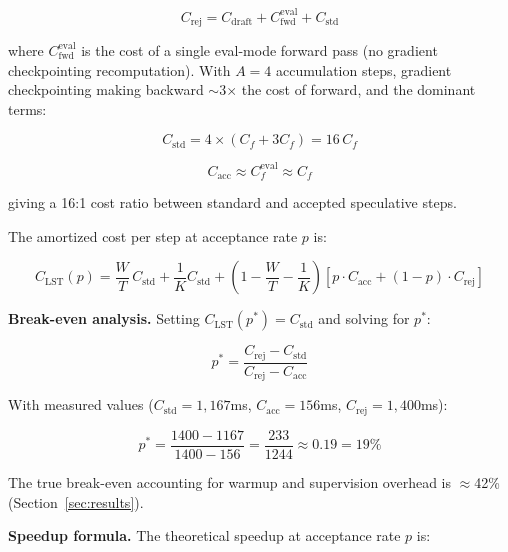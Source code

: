 \documentclass[conference]{IEEEtran}
\begin{document}
\begin{equation}
C_{\mathrm{rej}} = C_{\mathrm{draft}} + C_{\mathrm{fwd}}^{\mathrm{eval}} + C_{\mathrm{std}}
\label{eq:cost_rej}
\end{equation}

where $C_{\mathrm{fwd}}^{\mathrm{eval}}$ is the cost of a single eval-mode forward pass (no gradient checkpointing recomputation). With $A=4$ accumulation steps, gradient checkpointing making backward $\sim$3$\times$ the cost of forward, and the dominant terms:

\begin{equation}
C_{\mathrm{std}} = 4 \times (C_f + 3C_f) = 16\, C_f
\label{eq:cost_std_expanded}
\end{equation}

\begin{equation}
C_{\mathrm{acc}} \approx C_f^{\mathrm{eval}} \approx C_f
\label{eq:cost_acc_expanded}
\end{equation}

giving a 16:1 cost ratio between standard and accepted speculative steps.

The amortized cost per step at acceptance rate $p$ is:

\begin{equation}
C_{\mathrm{LST}}(p) = \frac{W}{T}\, C_{\mathrm{std}} + \frac{1}{K} C_{\mathrm{std}} + \left(1 - \frac{W}{T} - \frac{1}{K}\right) \left[p \cdot C_{\mathrm{acc}} + (1-p) \cdot C_{\mathrm{rej}}\right]
\label{eq:cost_total}
\end{equation}

\noindent\textbf{Break-even analysis.} Setting $C_{\mathrm{LST}}(p^*) = C_{\mathrm{std}}$ and solving for $p^*$:

\begin{equation}
p^* = \frac{C_{\mathrm{rej}} - C_{\mathrm{std}}}{C_{\mathrm{rej}} - C_{\mathrm{acc}}}
\label{eq:breakeven}
\end{equation}

With measured values ($C_{\mathrm{std}} = 1{,}167$ms, $C_{\mathrm{acc}} = 156$ms, $C_{\mathrm{rej}} = 1{,}400$ms):

\begin{equation}
p^* = \frac{1400 - 1167}{1400 - 156} = \frac{233}{1244} \approx 0.19 = 19\%
\end{equation}

The true break-even accounting for warmup and supervision overhead is $\approx$42\% (Section~\ref{sec:results}).

\noindent\textbf{Speedup formula.} The theoretical speedup at acceptance rate $p$ is:
\end{document}
